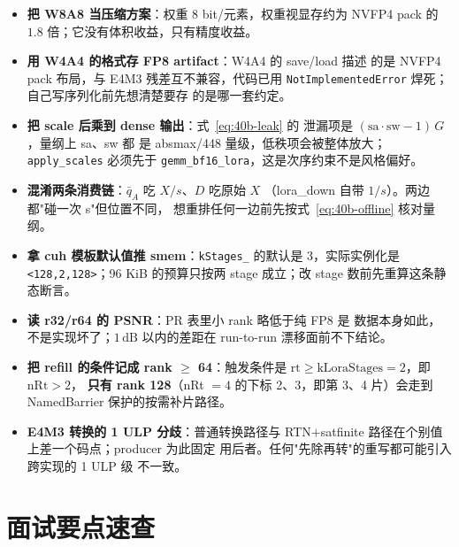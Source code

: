 \begin{itemize}[itemsep=1pt,topsep=2pt]
  \item \textbf{把 W8A8 当压缩方案}：权重 8 bit/元素，权重视显存约为
        NVFP4 pack 的 $1.8$ 倍；它没有体积收益，只有精度收益。
  \item \textbf{用 W4A4 的格式存 FP8 artifact}：W4A4 的 save/load 描述
        的是 NVFP4 pack 布局，与 E4M3 残差互不兼容，代码已用
        \texttt{NotImplementedError} 焊死；自己写序列化前先想清楚要存
        的是哪一套约定。
  \item \textbf{把 scale 后乘到 dense 输出}：式~\eqref{eq:40b-leak} 的
        泄漏项是 $(\mathrm{sa}\cdot\mathrm{sw}-1)\,G$，量纲上 sa、sw 都
        是 absmax/448 量级，低秩项会被整体放大；\texttt{apply\_scales}
        必须先于 \texttt{gemm\_bf16\_lora}，这是次序约束不是风格偏好。
  \item \textbf{混淆两条消费链}：$\bar q_A$ 吃 $X/s$、$D$ 吃原始 $X$
        （lora\_down 自带 $1/s$）。两边都"碰一次 s"但位置不同，
        想重排任何一边前先按式~\eqref{eq:40b-offline} 核对量纲。
  \item \textbf{拿 cuh 模板默认值推 smem}：\texttt{kStages\_} 的默认是
        3，实际实例化是 \texttt{<128,2,128>}；96 KiB 的预算只按两
        stage 成立；改 stage 数前先重算这条静态断言。
  \item \textbf{读 r32/r64 的 PSNR}：PR 表里小 rank 略低于纯 FP8 是
        数据本身如此，不是实现坏了；$1\,\mathrm{dB}$ 以内的差距在
        run-to-run 漂移面前不下结论。
  \item \textbf{把 refill 的条件记成 rank $\ge$ 64}：触发条件是
        $\mathrm{rt}\ge\mathrm{kLoraStages}=2$，即 $\mathrm{nRt}>2$，
        \textbf{只有 rank 128}（nRt $=4$ 的下标 2、3，即第 3、4 片）会走到
        NamedBarrier 保护的按需补片路径。
  \item \textbf{E4M3 转换的 1 ULP 分歧}：普通转换路径与
        RTN$+$satfinite 路径在个别值上差一个码点；producer 为此固定
        用后者。任何"先除再转"的重写都可能引入跨实现的 1 ULP 级
        不一致。
\end{itemize}

\section{面试要点速查}

